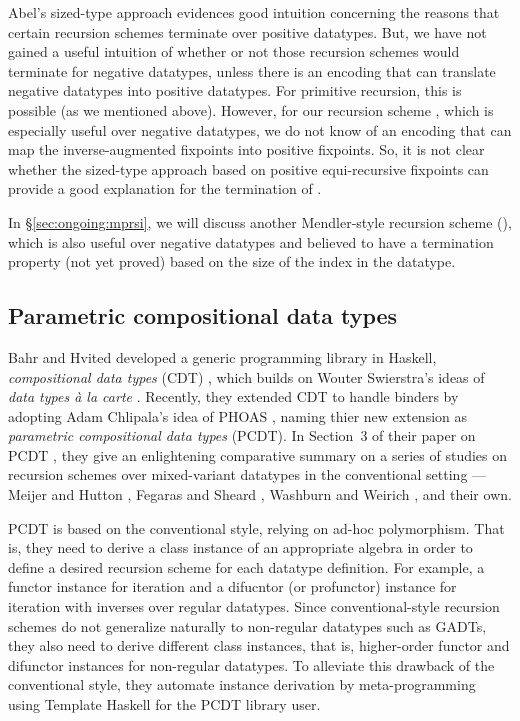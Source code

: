 Abel's sized-type approach evidences good intuition concerning the reasons
that certain recursion schemes terminate over positive datatypes.
But, we have not gained a useful intuition of whether or not those
recursion schemes would terminate for negative datatypes, unless there is
an encoding that can translate negative datatypes into positive datatypes.
For primitive recursion, this is possible (as we mentioned above). However,
for our recursion scheme \MsfIt, which is especially useful over negative
datatypes, we do not know of an encoding that can map the inverse-augmented
fixpoints into positive fixpoints. So, it is not clear whether the sized-type
approach based on positive equi-recursive fixpoints can provide
a good explanation for the termination of \MsfIt.

In \S\ref{sec:ongoing:mprsi}, we will discuss
another Mendler-style recursion scheme (\mprsi{}), which is also useful over
negative datatypes and believed to have a termination property (not yet proved)
based on the size of the index in the datatype.


\subsection{Parametric compositional data types}
\label{sec:relwork:PCDT}
Bahr and Hvited developed a generic programming library in Haskell,
\emph{compositional data types} (CDT) \cite{bahr11wgp}, which builds on
Wouter Swierstra's ideas of \emph{data types \`a la carte} \cite{WSout08jfp}.
Recently, they extended CDT to handle binders by adopting Adam Chlipala's
idea of PHOAS \cite{PHOAS}, naming thier new extension as
\emph{parametric compositional data types} (PCDT).
In Section~3 of their paper on PCDT \cite{BahHvi12}, they give an enlightening
comparative summary on a series of studies on recursion schemes over
mixed-variant datatypes in the conventional setting ---
Meijer and Hutton \cite{MeiHut95}, Fegaras and Sheard \cite{FegShe96},
Washburn and Weirich \cite{bgb}, and their own.

PCDT is based on the conventional style, relying on ad-hoc polymorphism.
That is, they need to derive a class instance of an appropriate algebra
in order to define a desired recursion scheme for each datatype definition.
For example, a functor instance for iteration and a difucntor (or profunctor)
instance for iteration with inverses over regular datatypes.
Since conventional-style recursion schemes do not generalize naturally
to non-regular datatypes such as GADTs, they also need to derive different
class instances, that is, higher-order functor and difunctor instances for
non-regular datatypes. To alleviate this drawback of the conventional style,
they automate instance derivation by meta-programming using Template Haskell
for the PCDT library user.

